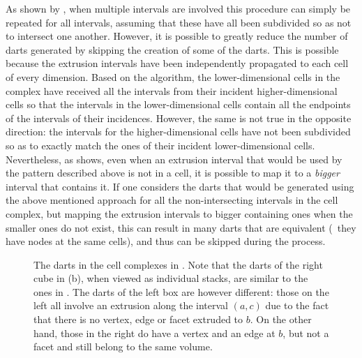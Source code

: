 As shown by \citet{Ferrucci93}, when multiple intervals are involved this procedure can simply be repeated for all intervals, assuming that these have all been subdivided so as not to intersect one another.
However, it is possible to greatly reduce the number of darts generated by skipping the creation of some of the darts.
This is possible because the extrusion intervals have been independently propagated to each cell of every dimension.
Based on the algorithm, the lower-dimensional cells in the complex have received all the intervals from their incident higher-dimensional cells so that the intervals in the lower-dimensional cells contain all the endpoints of the intervals of their incidences.
However, the same is not true in the opposite direction: the intervals for the higher-dimensional cells have not been subdivided so as to exactly match the ones of their incident lower-dimensional cells.
Nevertheless, as  shows, even when an extrusion interval that would be used by the pattern described above is not in a cell, it is possible to map it to a \emph{bigger} interval that contains it.
If one considers the darts that would be generated using the above mentioned approach for all the non-intersecting intervals in the cell complex, but mapping the extrusion intervals to bigger containing ones when the smaller ones do not exist, this can result in many darts that are equivalent (\ie\ they have nodes at the same cells), and thus can be skipped during the process.
\begin{figure}[tbp]
\centering
{}
\quad
{}
\caption[The darts in the cell complexes in ]{The darts in the cell complexes in .
Note that the darts of the right cube in (b), when viewed as individual stacks, are similar to the ones in .
The darts of the left box are however different: those on the left all involve an extrusion along the interval $(a,c)$ due to the fact that there is no vertex, edge or facet extruded to $b$.
On the other hand, those in the right do have a vertex and an edge at $b$, but not a facet and still belong to the same volume.}
\label{fig:blocks}
\end{figure}

